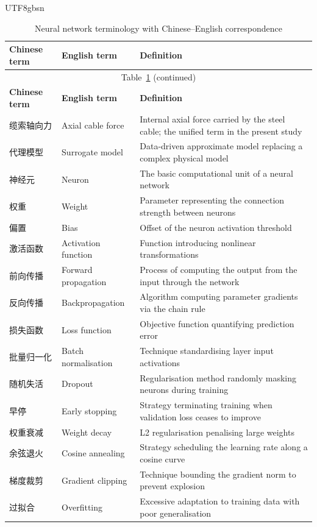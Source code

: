 \documentclass[a4paper,12pt]{report}
\begin{document}
\begin{CJK}{UTF8}{gbsn}
\begin{longtable}{p{3.5cm}lp{7cm}}
  \caption{Neural network terminology with Chinese--English correspondence} \label{tab:terms} \\
  \toprule
  \textbf{Chinese term} & \textbf{English term} & \textbf{Definition} \\
  \midrule
  \endfirsthead
  \multicolumn{3}{c}{\small Table~\ref{tab:terms} (continued)} \\
  \toprule \textbf{Chinese term} & \textbf{English term} & \textbf{Definition} \\ \midrule
  \endhead
  \bottomrule \endfoot
  缆索轴向力 & Axial cable force & Internal axial force carried by the steel cable; the unified term in the present study \\
  代理模型 & Surrogate model & Data-driven approximate model replacing a complex physical model \\
  神经元 & Neuron & The basic computational unit of a neural network \\
  权重 & Weight & Parameter representing the connection strength between neurons \\
  偏置 & Bias & Offset of the neuron activation threshold \\
  激活函数 & Activation function & Function introducing nonlinear transformations \\
  前向传播 & Forward propagation & Process of computing the output from the input through the network \\
  反向传播 & Backpropagation & Algorithm computing parameter gradients via the chain rule \\
  损失函数 & Loss function & Objective function quantifying prediction error \\
  批量归一化 & Batch normalisation & Technique standardising layer input activations \\
  随机失活 & Dropout & Regularisation method randomly masking neurons during training \\
  早停 & Early stopping & Strategy terminating training when validation loss ceases to improve \\
  权重衰减 & Weight decay & L2 regularisation penalising large weights \\
  余弦退火 & Cosine annealing & Strategy scheduling the learning rate along a cosine curve \\
  梯度裁剪 & Gradient clipping & Technique bounding the gradient norm to prevent explosion \\
  过拟合 & Overfitting & Excessive adaptation to training data with poor generalisation \\

\end{longtable}
\end{CJK}
\end{document}

